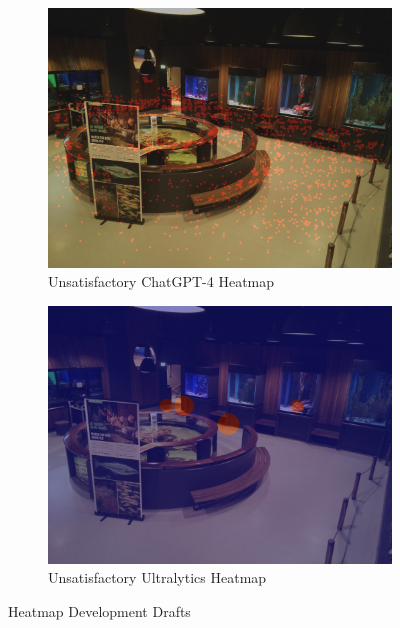 \begin{figure}[H]
    \centering
    \begin{subfigure}{0.49\textwidth}
        \centering
        \includegraphics[width=\textwidth]{Images/Analytics/heatmap_gpt.jpg}
        \caption{Unsatisfactory ChatGPT-4 Heatmap}
    \end{subfigure}
    \hfill
    \begin{subfigure}{0.49\textwidth}
        \centering
        \includegraphics[width=1\textwidth]{Images/Analytics/heatmap_ultralytics.jpg}
        \caption{Unsatisfactory Ultralytics Heatmap}
    \end{subfigure}
    \caption{Heatmap Development Drafts}
    \label{fig:heat_map_drafts}
\end{figure}

